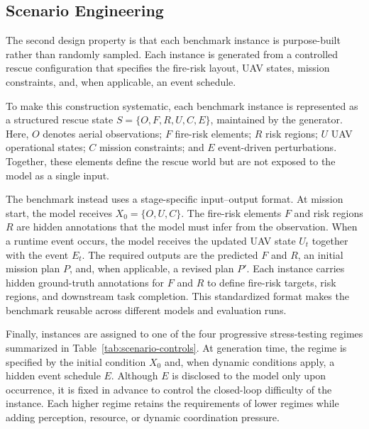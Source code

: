 

\subsection{Scenario Engineering}
The second design property is that each benchmark instance is purpose-built
rather than randomly sampled.
Each instance is generated from a controlled rescue configuration that specifies
the fire-risk layout, UAV states, mission constraints, and, when applicable, an
event schedule.

To make this construction systematic, each benchmark instance is represented
as a structured rescue state $S=\{O,F,R,U,C,E\}$, maintained by the generator.
Here, $O$ denotes aerial observations; $F$ fire-risk elements; $R$ risk regions;
$U$ UAV operational states; $C$ mission constraints; and $E$ event-driven
perturbations. Together, these elements define the rescue world but are not
exposed to the model as a single input.

The benchmark instead uses a stage-specific input--output format.
At mission start, the model receives $X_0=\{O,U,C\}$.
The fire-risk elements $F$ and risk regions $R$ are hidden annotations
that the model must infer from the observation. When a runtime event occurs,
the model receives the updated UAV state $U_t$ together with the event $E_t$.
The required outputs are the predicted $F$ and $R$, an initial mission plan $P$,
and, when applicable, a revised plan $P'$. Each instance carries hidden
ground-truth annotations for $F$ and $R$ to define fire-risk targets, risk
regions, and downstream task completion.
This standardized format makes the benchmark reusable
across different models and evaluation runs.

Finally, instances are assigned to one of the four progressive stress-testing
regimes summarized in Table~\ref{tab:scenario-controls}. At generation time,
the regime is specified by the initial condition $X_0$ and, when dynamic
conditions apply, a hidden event schedule $E$. Although $E$ is disclosed to the
model only upon occurrence, it is fixed in advance to control the closed-loop
difficulty of the instance. Each higher regime retains the requirements of lower
regimes while adding perception, resource, or dynamic coordination pressure.



